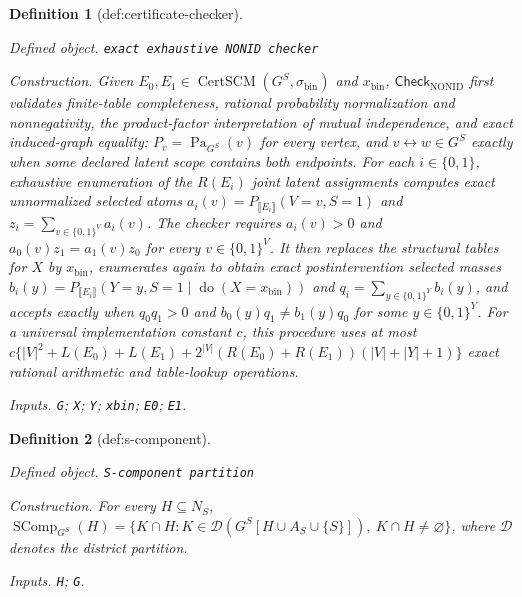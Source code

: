 \documentclass{article}
\newtheorem{definition}{Definition}
\begin{document}
\begin{definition}[def:certificate-checker]\label{def:certificate-checker}
\par\smallskip\noindent\emph{Defined object.} \texttt{exact exhaustive NONID checker}
\par\smallskip\noindent\emph{Construction.} Given \(E_0,E_1\in\operatorname{CertSCM}(G^S,\sigma_{\mathrm{bin}})\) and \(x_{\mathrm{bin}}\), \(\mathsf{Check}_{\mathrm{NONID}}\) first validates finite-table completeness, rational probability normalization and nonnegativity, the product-factor interpretation of mutual independence, and exact induced-graph equality: \(P_v=\operatorname{Pa}_{G^S}(v)\) for every vertex, and \(v\leftrightarrow w\in G^S\) exactly when some declared latent scope contains both endpoints. For each \(i\in\{0,1\}\), exhaustive enumeration of the \(R(E_i)\) joint latent assignments computes exact unnormalized selected atoms \(a_i(v)=P_{\llbracket E_i\rrbracket}(V=v,S=1)\) and \(z_i=\sum_{v\in\{0,1\}^V}a_i(v)\). The checker requires \(a_i(v)>0\) and \(a_0(v)z_1=a_1(v)z_0\) for every \(v\in\{0,1\}^V\). It then replaces the structural tables for \(X\) by \(x_{\mathrm{bin}}\), enumerates again to obtain exact postintervention selected masses \(b_i(y)=P_{\llbracket E_i\rrbracket}(Y=y,S=1\mid\operatorname{do}(X=x_{\mathrm{bin}}))\) and \(q_i=\sum_{y\in\{0,1\}^Y}b_i(y)\), and accepts exactly when \(q_0q_1>0\) and \(b_0(y)q_1\ne b_1(y)q_0\) for some \(y\in\{0,1\}^Y\). For a universal implementation constant \(c\), this procedure uses at most \(c\{|V|^2+L(E_0)+L(E_1)+2^{|V|}(R(E_0)+R(E_1))(|V|+|Y|+1)\}\) exact rational arithmetic and table-lookup operations.
\par\smallskip\noindent\emph{Inputs.} \texttt{G}; \texttt{X}; \texttt{Y}; \texttt{xbin}; \texttt{E0}; \texttt{E1}.
\end{definition}

\begin{definition}[def:s-component]\label{def:s-component}
\par\smallskip\noindent\emph{Defined object.} \texttt{S-\allowbreak{}component partition}
\par\smallskip\noindent\emph{Construction.} For every \(H\subseteq N_S\), \(\operatorname{SComp}_{G^S}(H)=\{K\cap H:K\in\mathcal D(G^S[H\cup A_S\cup\{S\}]),\ K\cap H\ne\varnothing\}\), where \(\mathcal D\) denotes the district partition.
\par\smallskip\noindent\emph{Inputs.} \texttt{H}; \texttt{G}.
\end{definition}
\end{document}

